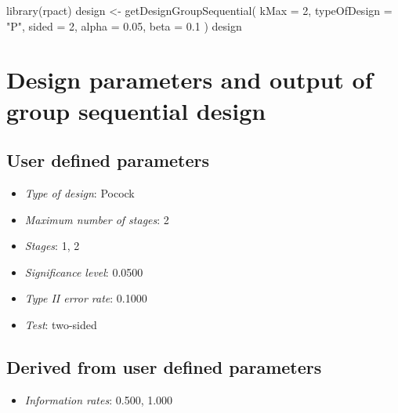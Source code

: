 \documentclass[
  letterpaper,
  DIV=11,
  numbers=noendperiod]{scrreprt}
\newenvironment{Shaded}{\begin{snugshade}}{\end{snugshade}}
\newcommand{\AttributeTok}[1]{\textcolor[rgb]{0.40,0.45,0.13}{#1}}
\newcommand{\DecValTok}[1]{\textcolor[rgb]{0.68,0.00,0.00}{#1}}
\newcommand{\FloatTok}[1]{\textcolor[rgb]{0.68,0.00,0.00}{#1}}
\newcommand{\FunctionTok}[1]{\textcolor[rgb]{0.28,0.35,0.67}{#1}}
\newcommand{\NormalTok}[1]{\textcolor[rgb]{0.00,0.23,0.31}{#1}}
\newcommand{\OtherTok}[1]{\textcolor[rgb]{0.00,0.23,0.31}{#1}}
\newcommand{\StringTok}[1]{\textcolor[rgb]{0.13,0.47,0.30}{#1}}
\providecommand{\tightlist}{%
  \setlength{\itemsep}{0pt}\setlength{\parskip}{0pt}}\usepackage{longtable,booktabs,array}
\begin{document}
\begin{Shaded}
\begin{Highlighting}[]
\FunctionTok{library}\NormalTok{(rpact)}
\NormalTok{design }\OtherTok{\textless{}{-}} \FunctionTok{getDesignGroupSequential}\NormalTok{(}
  \AttributeTok{kMax =} \DecValTok{2}\NormalTok{,}
  \AttributeTok{typeOfDesign =} \StringTok{"P"}\NormalTok{,}
  \AttributeTok{sided =} \DecValTok{2}\NormalTok{,}
  \AttributeTok{alpha =} \FloatTok{0.05}\NormalTok{,}
  \AttributeTok{beta =} \FloatTok{0.1}
\NormalTok{)}
\NormalTok{design}
\end{Highlighting}
\end{Shaded}

\hypertarget{design-parameters-and-output-of-group-sequential-design}{%
\section{Design parameters and output of group sequential
design}\label{design-parameters-and-output-of-group-sequential-design}}

\hypertarget{user-defined-parameters}{%
\subsection{User defined parameters}\label{user-defined-parameters}}

\begin{itemize}
\tightlist
\item
  \emph{Type of design}: Pocock
\item
  \emph{Maximum number of stages}: 2
\item
  \emph{Stages}: 1, 2
\item
  \emph{Significance level}: 0.0500
\item
  \emph{Type II error rate}: 0.1000
\item
  \emph{Test}: two-sided
\end{itemize}

\hypertarget{derived-from-user-defined-parameters}{%
\subsection{Derived from user defined
parameters}\label{derived-from-user-defined-parameters}}

\begin{itemize}
\tightlist
\item
  \emph{Information rates}: 0.500, 1.000
\end{itemize}
\end{document}
